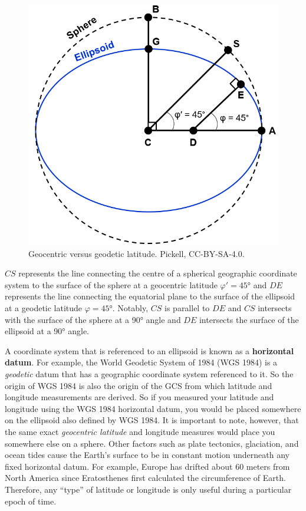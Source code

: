 \documentclass[
]{book}
\begin{document}
\begin{figure}
\includegraphics[width=0.75\linewidth]{images/02-geocentric-geodetic-latitude} \caption{Geocentric versus geodetic latitude. Pickell, CC-BY-SA-4.0.}\label{fig:2-geocentric-geodetic-latitude}
\end{figure}

\(CS\) represents the line connecting the centre of a spherical geographic coordinate system to the surface of the sphere at a geocentric latitude \(φ′=45°\) and \(DE\) represents the line connecting the equatorial plane to the surface of the ellipsoid at a geodetic latitude \(φ=45°\). Notably, \(CS\) is parallel to \(DE\) and \(CS\) intersects with the surface of the sphere at a 90° angle and \(DE\) intersects the surface of the ellipsoid at a 90° angle.

A coordinate system that is referenced to an ellipsoid is known as a \textbf{horizontal datum}. For example, the World Geodetic System of 1984 (WGS 1984) is a \emph{geodetic} datum that has a geographic coordinate system referenced to it. So the origin of WGS 1984 is also the origin of the GCS from which latitude and longitude measurements are derived. So if you measured your latitude and longitude using the WGS 1984 horizontal datum, you would be placed somewhere on the ellipsoid also defined by WGS 1984. It is important to note, however, that the same exact \emph{geocentric latitude} and longitude measures would place you somewhere else on a sphere. Other factors such as plate tectonics, glaciation, and ocean tides cause the Earth's surface to be in constant motion underneath any fixed horizontal datum. For example, Europe has drifted about 60 meters from North America since Eratosthenes first calculated the circumference of Earth. Therefore, any ``type'' of latitude or longitude is only useful during a particular epoch of time.
\end{document}
